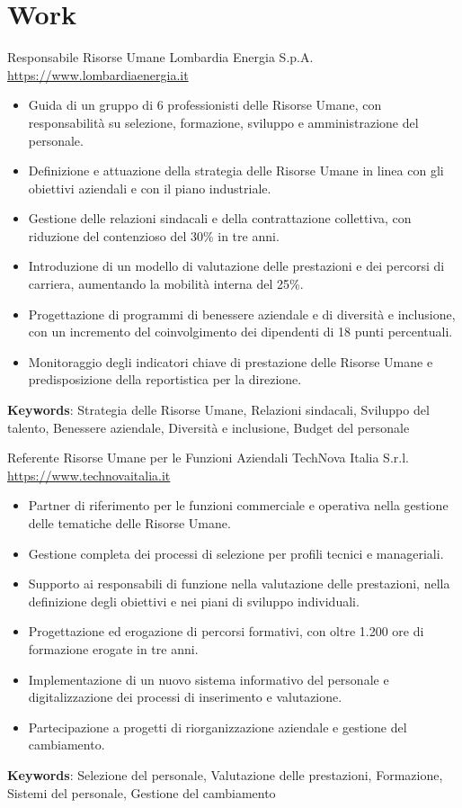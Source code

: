 \documentclass[a4paper, serif, 10pt]{moderncv}
\begin{document}
\section{Work}

        {Responsabile Risorse Umane}
        {Lombardia Energia S.p.A.}
        {\url{https://www.lombardiaenergia.it}}
        {}
        {\begin{itemize}
\item Guida di un gruppo di 6 professionisti delle Risorse Umane, con responsabilità su selezione, formazione, sviluppo e amministrazione del personale.
\item Definizione e attuazione della strategia delle Risorse Umane in linea con gli obiettivi aziendali e con il piano industriale.
\item Gestione delle relazioni sindacali e della contrattazione collettiva, con riduzione del contenzioso del 30\% in tre anni.
\item Introduzione di un modello di valutazione delle prestazioni e dei percorsi di carriera, aumentando la mobilità interna del 25\%.
\item Progettazione di programmi di benessere aziendale e di diversità e inclusione, con un incremento del coinvolgimento dei dipendenti di 18 punti percentuali.
\item Monitoraggio degli indicatori chiave di prestazione delle Risorse Umane e predisposizione della reportistica per la direzione.
\end{itemize}
\textbf{Keywords}: Strategia delle Risorse Umane, Relazioni sindacali, Sviluppo del talento, Benessere aziendale, Diversità e inclusione, Budget del personale}

        {Referente Risorse Umane per le Funzioni Aziendali}
        {TechNova Italia S.r.l.}
        {\url{https://www.technovaitalia.it}}
        {}
        {\begin{itemize}
\item Partner di riferimento per le funzioni commerciale e operativa nella gestione delle tematiche delle Risorse Umane.
\item Gestione completa dei processi di selezione per profili tecnici e manageriali.
\item Supporto ai responsabili di funzione nella valutazione delle prestazioni, nella definizione degli obiettivi e nei piani di sviluppo individuali.
\item Progettazione ed erogazione di percorsi formativi, con oltre 1.200 ore di formazione erogate in tre anni.
\item Implementazione di un nuovo sistema informativo del personale e digitalizzazione dei processi di inserimento e valutazione.
\item Partecipazione a progetti di riorganizzazione aziendale e gestione del cambiamento.
\end{itemize}
\textbf{Keywords}: Selezione del personale, Valutazione delle prestazioni, Formazione, Sistemi del personale, Gestione del cambiamento}
\end{document}
